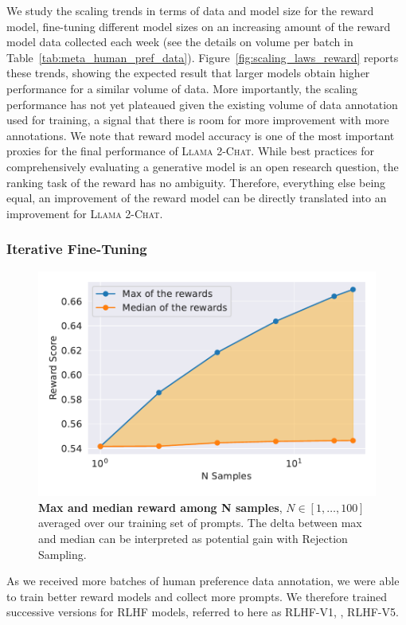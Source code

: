 \documentclass{article}
\newcommand{\modelname}{\textsc{Llama 2-Chat}\xspace}
\begin{document}
We study the scaling trends in terms of data and model size for the reward model, fine-tuning different model sizes on an increasing amount of the reward model data collected each week (see the details on volume per batch in Table~\ref{tab:meta_human_pref_data}). Figure~\ref{fig:scaling_laws_reward} reports these trends, showing the expected result that larger models obtain higher performance for a similar volume of data. More importantly, the scaling performance has not yet plateaued given the existing volume of data annotation used for training, a signal that there is room for more improvement with more annotations. We note that reward model accuracy is one of the most important proxies for the final performance of \modelname{}. While best practices for comprehensively evaluating a generative model is an open research question, the ranking task of the reward has no ambiguity. Therefore, everything else being equal, an improvement of the reward model can be directly translated into an improvement for \modelname{}.


\subsubsection{Iterative Fine-Tuning}
\label{subsec:rlhf_iter}

\begin{figure}
    \centering
    \includegraphics[width=0.5 \linewidth]{img/delta_reward.Batch8.pdf}
    \vspace{-0.2cm}
     \caption{\textbf{Max and median reward among N samples}, $N \in [1, \ldots, 100]$  averaged over our training set of prompts. The delta between max and median can be interpreted as potential gain with Rejection Sampling. }
     \vspace{-0.4cm}
    \label{fig:rlhf_delta_max_med_reward}
\end{figure}

As we received more batches of human preference data annotation, we were able to train better reward models and collect more prompts. We therefore trained  successive versions for RLHF models, referred to here as RLHF-V1, \textellipsis,  RLHF-V5.
\end{document}
